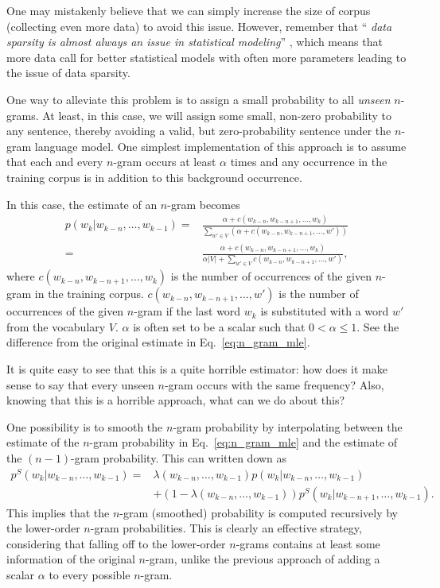 \documentclass{report}
\begin{document}
One may mistakenly believe that we can simply increase the size of corpus
(collecting even more data) to avoid this issue. However, remember that ``{\it
data sparsity is almost always an issue in statistical modeling}''
\cite{chen1996empirical}, which means that more data call for better statistical
models with often more parameters leading to the issue of data sparsity.

One way to alleviate this problem is to assign a small probability to all {\em
unseen} $n$-grams. At least, in this case, we will assign some small, non-zero
probability to any sentence, thereby avoiding a valid, but zero-probability
sentence under the $n$-gram language model. One simplest implementation of this
approach is to assume that each and every $n$-gram occurs at least $\alpha$
times and any occurrence in the training corpus is in addition to this
background occurrence. 

In this case, the estimate of an $n$-gram becomes
\begin{align*}
    p(w_k | w_{k-n}, \ldots, w_{k-1}) =&
    \frac{\alpha + c(w_{k-n}, w_{k-n+1}, \ldots, w_k)}{\sum_{w' \in V} (\alpha
    + c(w_{k-n}, w_{k-n+1}, \ldots, w'))} 
    \\
    =&
    \frac{\alpha + c(w_{k-n}, w_{k-n+1}, \ldots, w_k)}{\alpha |V| + \sum_{w' \in V}
    c(w_{k-n}, w_{k-n+1}, \ldots, w')},
\end{align*}
where $c(w_{k-n}, w_{k-n+1}, \ldots, w_k)$ is the number of occurrences of the
given $n$-gram in the training corpus. $c(w_{k-n}, w_{k-n+1}, \ldots, w')$ is
the number of occurrences of the given $n$-gram if the last word $w_k$ is
substituted with a word $w'$ from the vocabulary $V$. $\alpha$ is often set to
be a scalar such that $0 < \alpha \leq 1$. See the difference from the original
estimate in Eq.~\eqref{eq:n_gram_mle}.

It is quite easy to see that this is a quite horrible estimator: how does it
make sense to say that every unseen $n$-gram occurs with the same frequency?
Also, knowing that this is a horrible approach, what can we do about this?

One possibility is to smooth the $n$-gram probability by interpolating between
the estimate of the $n$-gram probability in Eq.~\eqref{eq:n_gram_mle} and the
estimate of the $(n-1)$-gram probability. This can written down as
\begin{align}
    p^S(w_k | w_{k-n}, \ldots, w_{k-1}) = &
    \lambda(w_{k-n}, \ldots, w_{k-1}) p(w_k | w_{k-n}, \ldots, w_{k-1}) 
    \nonumber \\
    \label{eq:n_gram_smooth}
    & + (1 - \lambda(w_{k-n}, \ldots, w_{k-1})) p^S(w_k | w_{k-n+1}, \ldots,
    w_{k-1}).
\end{align}
This implies that the $n$-gram (smoothed) probability is computed recursively by
the lower-order $n$-gram probabilities. This is clearly an effective strategy,
considering that falling off to the lower-order $n$-grams contains at least some
information of the original $n$-gram, unlike the previous approach of adding a
scalar $\alpha$ to every possible $n$-gram.
\end{document}

